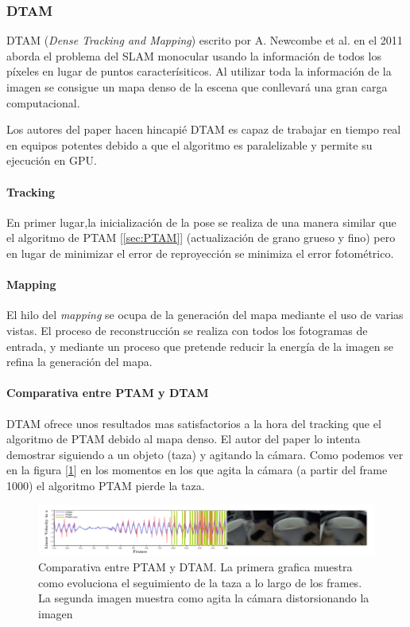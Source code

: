 \documentclass{bmvc2k}
\begin{document}
\subsubsection{DTAM}
DTAM (\textit{Dense Tracking and Mapping}) escrito por A. Newcombe et al. en el 2011 \cite{DTAM} aborda el problema del SLAM monocular usando la información de todos los píxeles en lugar de puntos caracterísiticos. Al utilizar toda la información de la imagen se consigue un mapa denso de la escena que conllevará una gran carga computacional.

Los autores del paper hacen hincapié DTAM es capaz de trabajar en tiempo real en equipos potentes debido a que el algoritmo es paralelizable y permite su ejecución en GPU.

\paragraph{Tracking}
En primer lugar,la inicialización de la pose se realiza de una manera similar que el algoritmo de PTAM [\ref{sec:PTAM}] (actualización de grano grueso y fino) pero en lugar de minimizar el error de reproyección se minimiza el error fotométrico.
\paragraph{Mapping}

El hilo del \textit{mapping} se ocupa de la generación del mapa mediante el uso de varias vistas. El proceso de reconstrucción se realiza con todos los fotogramas de entrada, y mediante un proceso que pretende reducir la energía de la imagen se refina la generación del mapa.


\paragraph{Comparativa entre PTAM y DTAM} DTAM ofrece unos resultados mas satisfactorios a la hora del tracking que el algoritmo de PTAM debido al mapa denso. El autor del paper lo intenta demostrar siguiendo a un objeto (taza) y agitando la cámara. Como podemos ver en la figura [\ref{fig:DTAM}] en los momentos en los que agita la cámara (a partir del frame 1000) el algoritmo PTAM pierde la taza.
\begin{figure}[H]
	\centering\includegraphics[width=12cm]{images/DTAM.png}
	\caption{Comparativa entre PTAM y DTAM. La primera grafica muestra como evoluciona el seguimiento de la taza a lo largo de los frames. La segunda imagen muestra como agita la cámara distorsionando la imagen}
	\label{fig:DTAM}
\end{figure}
\end{document}
